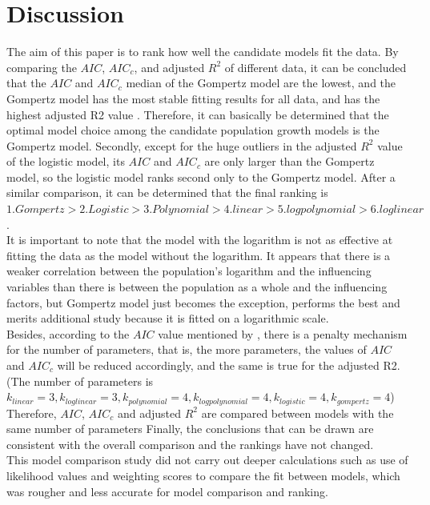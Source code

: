 \documentclass[11pt]{article}
\begin{document}
\section{Discussion}
The aim of this paper is to rank how well the candidate models fit the data. By comparing the $AIC$, $AIC_c$, and adjusted $R^2$ of different data, it can be concluded that the $AIC$ and $AIC_c$ median of the Gompertz model are the lowest, and the Gompertz model has the most stable fitting results for all data, and has the highest adjusted R2 value . Therefore, it can basically be determined that the optimal model choice among the candidate population growth models is the Gompertz model. Secondly, except for the huge outliers in the adjusted $R^2$ value of the logistic model, its $AIC$ and $AIC_c$ are only larger than the Gompertz model, so the logistic model ranks second only to the Gompertz model. After a similar comparison, it can be determined that the final ranking is $1.Gompertz >2.Logistic> 3.Polynomial> 4. linear> 5.log polynomial> 6.log linear$. \\

It is important to note that the model with the logarithm is not as effective at fitting the data as the model without the logarithm. It appears that there is a weaker correlation between the population's logarithm and the influencing variables than there is between the population as a whole and the influencing factors, but Gompertz model just becomes the exception, performs the best and merits additional study because it is fitted on a logarithmic scale. \\

Besides, according to the $AIC$ value mentioned by \cite{brewer2016relative}, there is a penalty mechanism for the number of parameters, that is, the more parameters, the values of $AIC$ and $AIC_c$ will be reduced accordingly, and the same is true for the adjusted R2.(The number of parameters is $k_{linear}=3, k_{loglinear}=3, k_{polynomial}=4, k_{logpolynomial}=4, k_{logistic}=4, k_{gompertz}=4$) Therefore, $AIC$, $AIC_c$ and adjusted $R^2$ are compared between models with the same number of parameters Finally, the conclusions that can be drawn are consistent with the overall comparison and the rankings have not changed.\\

This model comparison study did not carry out deeper calculations such as \cite{johnson2004model} use of likelihood values and weighting scores to compare the fit between models, which was rougher and less accurate for model comparison and ranking. \\
\end{document}
